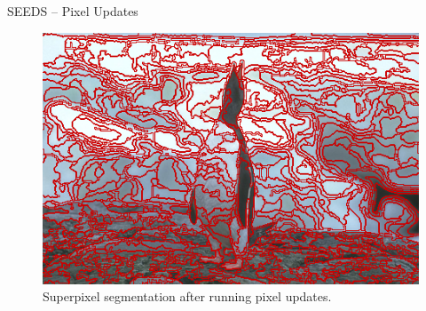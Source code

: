 \documentclass[handout]{beamer}
\begin{document}
%		
%		
%		
	
	

	\begin{frame}{SEEDS -- Pixel Updates}
		\begin{figure}
   			\centering
   			\includegraphics[scale=0.5]{images/bsd-2-reseedsmp-400}
   			\caption{Superpixel segmentation after running pixel updates.}
   		\end{figure}
	\end{frame}
\end{document}
